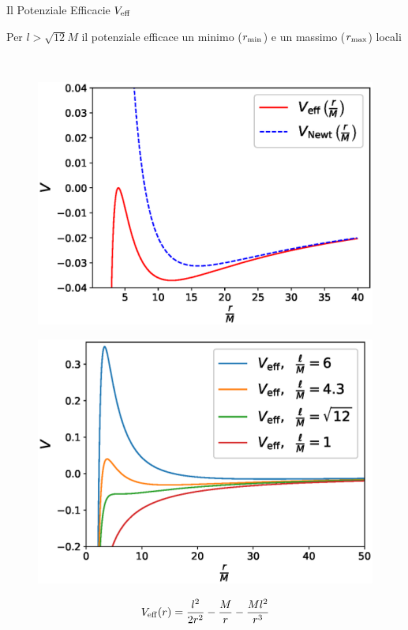 \begin{frame}{Il Potenziale Efficacie $V_{\rm eff}$}

    Per $l > \sqrt{12} M$ il potenziale efficace un minimo ($r_{\rm min}$) e un
    massimo ($r_{\rm max}$) locali

    ~

    \begin{minipage}{0.49 \textwidth}
        \begin{figure}
            \centering
            \includegraphics[width=\textwidth]{Figures/ch1/V_eff.eps}
        \end{figure}
    \end{minipage}
    \begin{minipage}{0.49 \textwidth}
        \begin{figure}
            \centering
            \includegraphics[width=\textwidth]{Figures/ch1/V_eff_tanti.eps}
        \end{figure}
    \end{minipage}

    \begin{equation*}
        V_{\rm eff}(r) = \frac{l^2}{2 r^2} - \frac{M}{r} - \frac{M l^2}{r^3}
    \end{equation*}

\end{frame}


